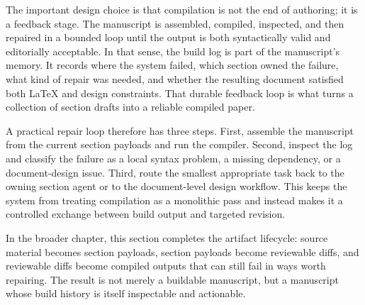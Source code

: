 The important design choice is that compilation is not the end of authoring; it is a feedback stage. The manuscript is assembled, compiled, inspected, and then repaired in a bounded loop until the output is both syntactically valid and editorially acceptable. In that sense, the build log is part of the manuscript's memory. It records where the system failed, which section owned the failure, what kind of repair was needed, and whether the resulting document satisfied both LaTeX and design constraints. That durable feedback loop is what turns a collection of section drafts into a reliable compiled paper.

A practical repair loop therefore has three steps. First, assemble the manuscript from the current section payloads and run the compiler. Second, inspect the log and classify the failure as a local syntax problem, a missing dependency, or a document-design issue. Third, route the smallest appropriate task back to the owning section agent or to the document-level design workflow. This keeps the system from treating compilation as a monolithic pass and instead makes it a controlled exchange between build output and targeted revision.

In the broader chapter, this section completes the artifact lifecycle: source material becomes section payloads, section payloads become reviewable diffs, and reviewable diffs become compiled outputs that can still fail in ways worth repairing. The result is not merely a buildable manuscript, but a manuscript whose build history is itself inspectable and actionable.
